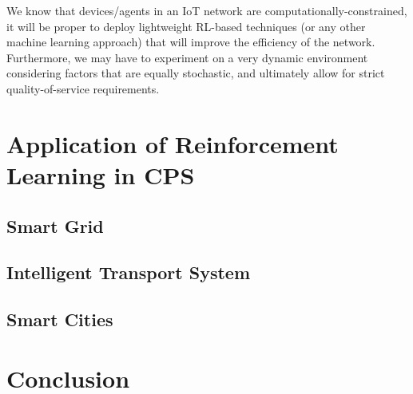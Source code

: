 \documentclass[journal]{IEEEtran}
\begin{document}
We know that devices/agents in an IoT network are computationally-constrained, it will be proper to deploy lightweight RL-based techniques (or any other machine learning approach) that will improve the efficiency of the network. Furthermore, we may have to experiment on a very dynamic environment considering factors that are equally stochastic, and ultimately allow for strict quality-of-service requirements.


\section{Application of Reinforcement Learning in CPS}

\subsection{Smart Grid}

\subsection{Intelligent Transport System}

\subsection{Smart Cities}


\section{Conclusion}\label{sec:conclusions}









\ifCLASSOPTIONcaptionsoff
  \newpage
\fi


\end{document}
